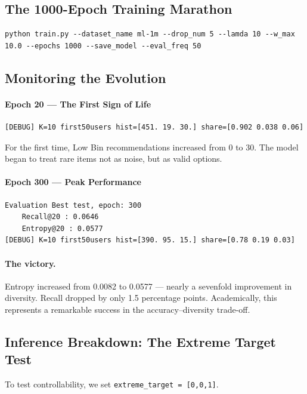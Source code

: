 \documentclass[11pt,a4paper]{article}
\begin{document}
\subsection{The 1000-Epoch Training Marathon}
\begin{lstlisting}[style=bash]
python train.py --dataset_name ml-1m --drop_num 5 --lamda 10 --w_max 10.0 --epochs 1000 --save_model --eval_freq 50
\end{lstlisting}

\subsection{Monitoring the Evolution}

\paragraph{Epoch 20 --- The First Sign of Life}
\begin{lstlisting}[style=textout]
[DEBUG] K=10 first50users hist=[451. 19. 30.] share=[0.902 0.038 0.06]
\end{lstlisting}

For the first time, Low Bin recommendations increased from 0 to 30. The model began to treat rare items not as noise, but as valid options.

\paragraph{Epoch 300 --- Peak Performance}
\begin{lstlisting}[style=textout]
Evaluation Best test, epoch: 300
    Recall@20 : 0.0646
    Entropy@20 : 0.0577
[DEBUG] K=10 first50users hist=[390. 95. 15.] share=[0.78 0.19 0.03]
\end{lstlisting}

\paragraph{The victory.}
Entropy increased from 0.0082 to 0.0577 --- nearly a sevenfold improvement in diversity. Recall dropped by only 1.5 percentage points. Academically, this represents a remarkable success in the accuracy--diversity trade-off.

\subsection{Inference Breakdown: The Extreme Target Test}
To test controllability, we set \texttt{extreme\_target = [0,0,1]}.
\end{document}
